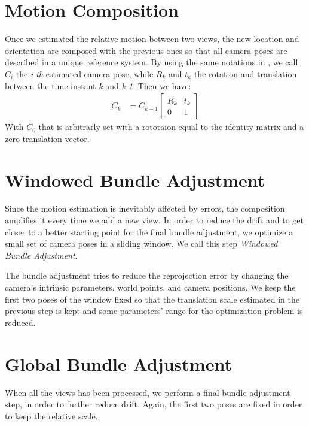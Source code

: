 \section{Motion Composition}
Once we estimated the relative motion between two views, the new location and 
orientation are composed with the previous ones so that all camera poses are
described in a unique reference system. By using the same notations in 
\cite{scaramuzzaVisualOdometryI}, we call \( C_i \) the \textit{i-th} 
estimated camera pose, while \( R_k \) and \( t_k \) the rotation and 
translation between the time instant \textit{k} and \textit{k-1}. Then we have:
\begin{align}
	C_k &= C_{k-1}
	\begin{bmatrix}
		R_k & t_k \\
		0 & 1
	\end{bmatrix}
\end{align}
With \( C_0 \) that is arbitrarly set with a rototaion equal to the identity
matrix and a zero translation vector.

\section{Windowed Bundle Adjustment}
Since the motion estimation is inevitably affected by errors,  
the composition amplifies it every time we add a new
view. In order to reduce the drift and to get closer to a better starting point 
for the final bundle adjustment, we optimize a small set of camera poses in 
a sliding window. We call this step \textit{Windowed Bundle Adjustment}.

The bundle adjustment tries to reduce the reprojection error by changing the
camera's intrinsic parameters, world points, and camera positions. 
We keep the first two poses of the window fixed so that the translation scale 
estimated in the previous step is kept and some parameters' range for the 
optimization problem is reduced.

\section{Global Bundle Adjustment}
When all the views has been processed, we perform a final bundle adjustment 
step, in order to further reduce drift. Again, the first two poses are fixed in 
order to keep the relative scale.
